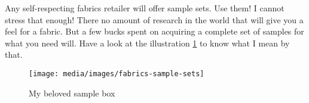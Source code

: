 Any self-respecting fabrics retailer will offer sample sets. Use them! I cannot stress that enough! There no amount of research in the world that will give you a feel for a fabric. But a few bucks spent on acquiring a complete set of samples for what you need will. Have a look at the illustration \ref{img:fabrics-sample-sets} to know what I mean by that.

\begin{figure}[H]
  \texttt{[image: media/images/fabrics-sample-sets]}
  \caption{My beloved sample box}
  \label{img:fabrics-sample-sets}
\end{figure}
